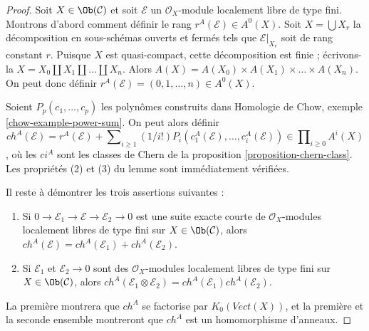 \begin{proof}
Soit $X \in \Ob(\mathcal{C})$ et soit $\mathcal{E}$ un
$\mathcal{O}_X$-module localement libre de type fini. Montrons d'abord comment définir
le rang $r^A(\mathcal{E}) \in A^0(X)$. Soit $X = \bigcup X_r$
la décomposition en sous-schémas ouverts et fermés tels que
$\mathcal{E}|_{X_r}$ soit de rang constant $r$. Puisque $X$ est quasi-compact, cette
décomposition est finie ; écrivons-la $X = X_0 \amalg X_1 \amalg \ldots \amalg X_n$.
Alors $A(X) = A(X_0) \times A(X_1) \times \ldots \times A(X_n)$. On peut donc
définir $r^A(\mathcal{E}) = (0, 1, \ldots, n) \in A^0(X)$.

\medskip\noindent
Soient $P_p(c_1, \ldots, c_p)$ les polynômes construits dans
Homologie de Chow, exemple \ref{chow-example-power-sum}.
On peut alors définir
$$
ch^A(\mathcal{E}) = r^A(\mathcal{E}) +
\sum\nolimits_{i \geq 1} (1/i!)
P_i(c^A_1(\mathcal{E}), \ldots, c^A_i(\mathcal{E}))
\in \prod\nolimits_{i \geq 0} A^i(X)
$$,
où les $ci^A$ sont les classes de Chern de la
proposition \ref{proposition-chern-class}.
Les propriétés (2) et (3) du lemme sont immédiatement vérifiées.

\medskip\noindent
Il reste à démontrer les trois assertions suivantes :
\begin{enumerate}
\item Si $0 \to \mathcal{E}_1 \to \mathcal{E} \to \mathcal{E}_2 \to 0$
est une suite exacte courte de $\mathcal{O}_X$-modules localement libres de type fini
sur $X \in \Ob(\mathcal{C})$, alors
$ch^A(\mathcal{E}) = ch^A(\mathcal{E}_1) + ch^A(\mathcal{E}_2)$.
\item Si $\mathcal{E}_1$ et $\mathcal{E}_2 \to 0$ sont des
$\mathcal{O}_X$-modules localement libres de type fini sur $X \in \Ob(\mathcal{C})$, alors
$ch^A(\mathcal{E}_1 \otimes \mathcal{E}_2) =
ch^A(\mathcal{E}_1) ch^A(\mathcal{E}_2)$.
\end{enumerate}
La première montrera que $ch^A$ se factorise par
$K_0(\textit{Vect}(X))$, et la première et la seconde ensemble
montreront que $ch^A$ est un homomorphisme d'anneaux.


\end{proof}
